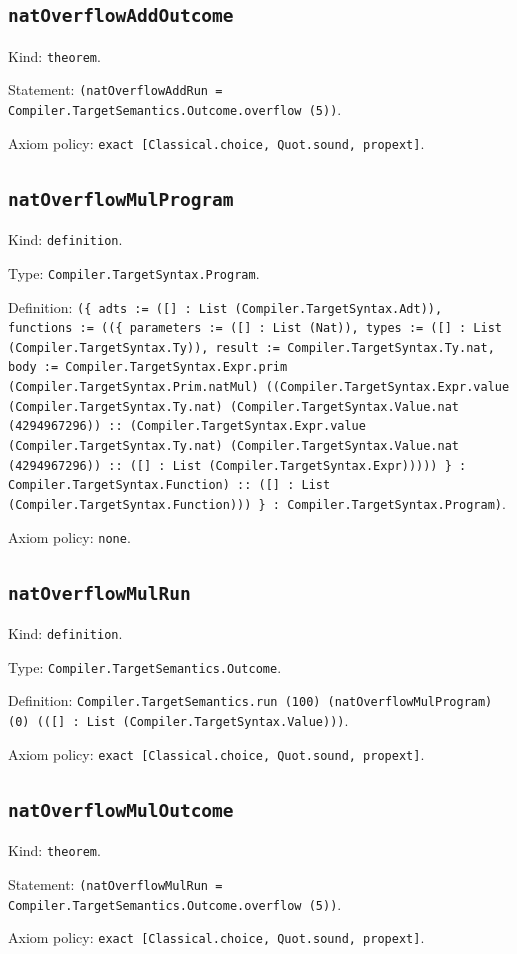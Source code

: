 \documentclass[11pt]{article}
\begin{document}
\subsection*{\texttt{natOverflowAddOutcome}}
\noindent Kind: \texttt{theorem}.\par
\noindent Statement: \texttt{(natOverflowAddRun = Compiler.TargetSemantics.Outcome.overflow (5))}.\par
\noindent Axiom policy: \texttt{exact [Classical.choice, Quot.sound, propext]}.\par
\subsection*{\texttt{natOverflowMulProgram}}
\noindent Kind: \texttt{definition}.\par
\noindent Type: \texttt{Compiler.TargetSyntax.Program}.\par
\noindent Definition: \texttt{(\{ adts := ([] : List (Compiler.TargetSyntax.Adt)), functions := ((\{ parameters := ([] : List (Nat)), types := ([] : List (Compiler.TargetSyntax.Ty)), result := Compiler.TargetSyntax.Ty.nat, body := Compiler.TargetSyntax.Expr.prim (Compiler.TargetSyntax.Prim.natMul) ((Compiler.TargetSyntax.Expr.value (Compiler.TargetSyntax.Ty.nat) (Compiler.TargetSyntax.Value.nat (4294967296)) :: (Compiler.TargetSyntax.Expr.value (Compiler.TargetSyntax.Ty.nat) (Compiler.TargetSyntax.Value.nat (4294967296)) :: ([] : List (Compiler.TargetSyntax.Expr))))) \} : Compiler.TargetSyntax.Function) :: ([] : List (Compiler.TargetSyntax.Function))) \} : Compiler.TargetSyntax.Program)}.\par
\noindent Axiom policy: \texttt{none}.\par
\subsection*{\texttt{natOverflowMulRun}}
\noindent Kind: \texttt{definition}.\par
\noindent Type: \texttt{Compiler.TargetSemantics.Outcome}.\par
\noindent Definition: \texttt{Compiler.TargetSemantics.run (100) (natOverflowMulProgram) (0) (([] : List (Compiler.TargetSyntax.Value)))}.\par
\noindent Axiom policy: \texttt{exact [Classical.choice, Quot.sound, propext]}.\par
\subsection*{\texttt{natOverflowMulOutcome}}
\noindent Kind: \texttt{theorem}.\par
\noindent Statement: \texttt{(natOverflowMulRun = Compiler.TargetSemantics.Outcome.overflow (5))}.\par
\noindent Axiom policy: \texttt{exact [Classical.choice, Quot.sound, propext]}.\par
\end{document}
